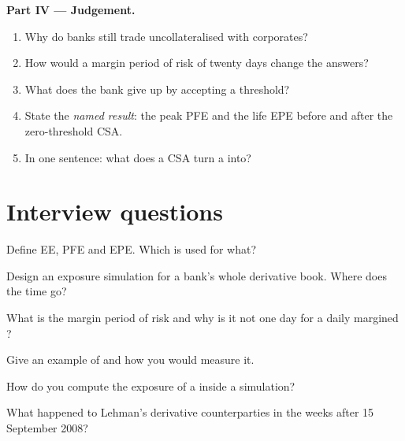 \begin{problem}
\medskip\noindent\textbf{Part IV --- Judgement.}
\begin{enumerate}[resume]
\item Why do banks still trade uncollateralised with corporates?
\item How would a margin period of risk of twenty days change the answers?
\item What does the bank give up by accepting a threshold?
\item State the \emph{named result}: the peak PFE and the life EPE before and after the
zero-threshold CSA.
\item In one sentence: what does a CSA turn a  into?
\end{enumerate}
\end{problem}

\section{Interview questions}

\begin{interviewq}\label{iq:rc:counterparty-exposure:1}
Define EE, PFE and EPE. Which is used for what?
\end{interviewq}

\begin{interviewq}\label{iq:rc:counterparty-exposure:2}
Design an exposure simulation for a bank's whole derivative book. Where does the time go?
\end{interviewq}

\begin{interviewq}\label{iq:rc:counterparty-exposure:3}
What is the margin period of risk and why is it not one day for a daily margined ?
\end{interviewq}

\begin{interviewq}\label{iq:rc:counterparty-exposure:4}
Give an example of  and how you would measure it.
\end{interviewq}

\begin{interviewq}\label{iq:rc:counterparty-exposure:5}
How do you compute the exposure of a  inside a simulation?
\end{interviewq}

\begin{interviewq}\label{iq:rc:counterparty-exposure:6}
What happened to Lehman's derivative counterparties in the weeks after 15 September 2008?
\end{interviewq}

